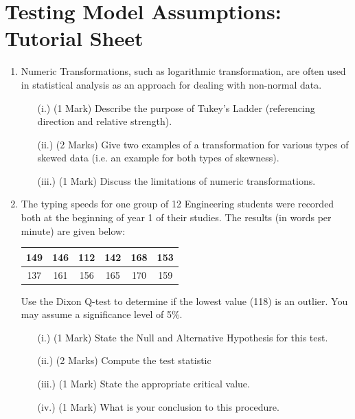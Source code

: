 \documentclass[a4paper,12pt]{article}
\begin{document}
	\section*{Testing Model Assumptions: Tutorial Sheet}


\begin{enumerate}


\item 
Numeric Transformations, such as logarithmic transformation, are often used in statistical analysis as an approach for dealing with non-normal data.
\begin{itemize}
	\item[(i.)] (1 Mark) Describe the purpose of Tukey's Ladder (referencing direction and relative strength).
	\item[(ii.)] (2 Marks) Give two examples of a transformation for various types of skewed data (i.e. an example for both types of skewness).
	\item[(iii.)] (1 Mark) Discuss the limitations of numeric transformations.
\end{itemize}
\bigskip

\item 
The typing speeds for one group of 12 Engineering students were recorded both at the beginning of year 1 of their studies. The results (in words per minute) are given below:

\begin{center}
	\begin{tabular}{|c|c|c|c|c|c|}
		\hline
		149  & 146 & 112 & 142 & 168& 153\\ \hline
		137 & 161 & 156& 165&  170&  159
		\\ \hline
	\end{tabular}
\end{center}
Use the Dixon Q-test to determine if the lowest value (118) is an outlier. You may assume a significance level of 5\%.
\begin{itemize}
	\item[(i.)](1 Mark)	State the Null and Alternative Hypothesis for this test.
	\item[(ii.)](2 Marks) Compute the test statistic
	\item[(iii.)](1 Mark) State the appropriate critical value.
	\item[(iv.)](1 Mark) What is your conclusion to this procedure.
\end{itemize}


\end{enumerate}
\end{document}
